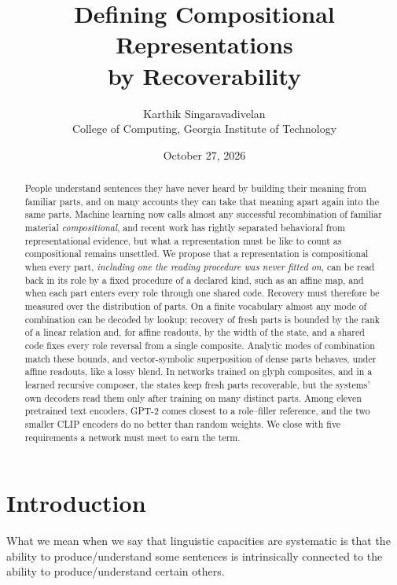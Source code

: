 \documentclass[10pt]{article}
\title{Defining Compositional Representations\\ by Recoverability}
\author{Karthik Singaravadivelan\\ College of Computing, Georgia Institute of Technology}
\date{October 27, 2026}
\theoremstyle{plain}
\theoremstyle{remark}
\begin{document}
\maketitle

\begin{abstract}
People understand sentences they have never heard by building their meaning from familiar parts, and on many accounts they can take that meaning apart again into the same parts. Machine learning now calls almost any successful recombination of familiar material \emph{compositional}, and recent work has rightly separated behavioral from representational evidence, but what a representation must be like to count as compositional remains unsettled. We propose that a representation is compositional when every part, \emph{including one the reading procedure was never fitted on}, can be read back in its role by a fixed procedure of a declared kind, such as an affine map, and when each part enters every role through one shared code. Recovery must therefore be measured over the distribution of parts. On a finite vocabulary almost any mode of combination can be decoded by lookup; recovery of fresh parts is bounded by the rank of a linear relation and, for affine readouts, by the width of the state, and a shared code fixes every role reversal from a single composite. Analytic modes of combination match these bounds, and vector-symbolic superposition of dense parts behaves, under affine readouts, like a lossy blend. In networks trained on glyph composites, and in a learned recursive composer, the states keep fresh parts recoverable, but the systems' own decoders read them only after training on many distinct parts. Among eleven pretrained text encoders, GPT-2 comes closest to a role--filler reference, and the two smaller CLIP encoders do no better than random weights. We close with five requirements a network must meet to earn the term.
\end{abstract}

\section{Introduction}
\label{sec:intro}

\epigraph{What we mean when we say that linguistic capacities are systematic is that the ability to produce/understand some sentences is intrinsically connected to the ability to produce/understand certain others.}{\citet{fodor1988}}
\end{document}
